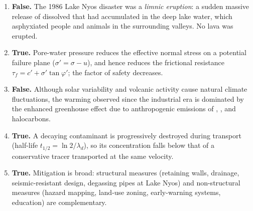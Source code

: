 \documentclass[11pt]{article}
\begin{document}
\begin{corrige}
\begin{enumerate}
\item \textbf{False.} The 1986 Lake Nyos disaster was a \emph{limnic eruption}: a sudden massive release of dissolved  that had accumulated in the deep lake water, which asphyxiated people and animals in the surrounding valleys. No lava was erupted.
\item \textbf{True.} Pore-water pressure reduces the effective normal stress on a potential failure plane ($\sigma' = \sigma - u$), and hence reduces the frictional resistance $\tau_f = c' + \sigma'\tan\varphi'$; the factor of safety decreases.
\item \textbf{False.} Although solar variability and volcanic activity cause natural climate fluctuations, the warming observed since the industrial era is dominated by the enhanced greenhouse effect due to anthropogenic emissions of , ,  and halocarbons.
\item \textbf{True.} A decaying contaminant is progressively destroyed during transport (half-life $t_{1/2} = \ln 2/\lambda_d$), so its concentration falls below that of a conservative tracer transported at the same velocity.
\item \textbf{True.} Mitigation is broad: structural measures (retaining walls, drainage, seismic-resistant design, degassing pipes at Lake Nyos) and non-structural measures (hazard mapping, land-use zoning, early-warning systems, education) are complementary.
\end{enumerate}
\end{corrige}
\end{document}
